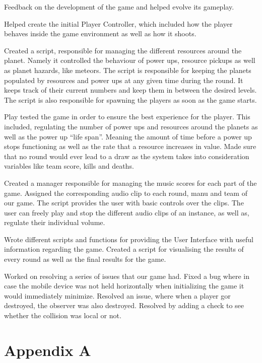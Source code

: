 \documentclass[11pt,a4paper]{article}
\begin{document}
        Feedback on the development of the game and helped evolve its gameplay.
         
        Helped create the initial Player Controller, which included how the player behaves inside the game environment as well as how it shoots.  

        Created a script, responsible for managing the different resources around the planet. Namely it controlled the behaviour of power ups, resource pickups as well as planet hazards, like meteors. The script is responsible for keeping the planets populated by resources and power ups at any given time during the round. It keeps track of their current numbers and keep them in between the desired levels. The script is also responsible for spawning the players as soon as the game starts.

        Play tested the game in order to ensure the best experience for the player. This included, regulating the number of power ups and resources around the planets as well as the power up “life span”. Meaning the amount of time before a power up stops functioning as well as the rate that a resource increases in value. Made sure that no round would ever lead to a draw as the system takes into consideration variables like team score, kills and deaths.

        Created a manager responsible for managing the music scores for each part of the game. Assigned the corresponding audio clip to each round, manu and team of our game. The script provides the user with basic controls over the clips. The user can freely play and stop the different audio clips of an instance, as well as, regulate their individual volume.

        Wrote different scripts and functions for providing the User Interface with useful information regarding the game. Created a script for visualising the results of every round as well as the final results for the game. 

        Worked on resolving a series of issues that our game had. Fixed a bug where in case the mobile device was not held horizontally when initializing the game it would immediately minimize. Resolved an issue, where when a player gor destroyed, the observer was also destroyed. Resolved by adding a check to see whether the collision was local or not.

\pagebreak
        \section{Appendix A}
\end{document}
